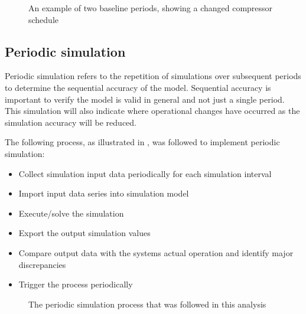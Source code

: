 		\begin{figure}[h]
			\centering
			\fbox{}
			\caption{An example of two baseline periods, showing a changed compressor schedule}
			\label{fig: Compressor schedule}
		\end{figure}
	\subsection{Periodic simulation}	
		Periodic simulation refers to the repetition of simulations over subsequent periods to determine the sequential accuracy of the model. Sequential accuracy is important to verify the model is valid in general and not just a single period. This simulation will also indicate where operational changes have occurred as the simulation accuracy will be reduced.
		\par 
		The following process, as illustrated in , was followed to implement periodic simulation: 
		\begin{itemize}
			\item Collect simulation input data periodically for each simulation interval
			\item Import input data series into simulation model
			\item Execute/solve the simulation
			\item Export the output simulation values
			\item Compare output data with the systems actual operation and identify major discrepancies
			\item Trigger the process periodically
		\end{itemize}
	\clearpage
		\begin{figure}[h]
			\centering
			\caption{The periodic simulation process that was followed in this analysis}
			\label{fig: PeriodicProcess}
		\end{figure}
	

